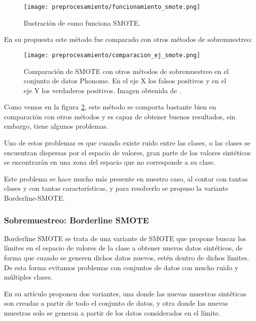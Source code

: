 \begin{figure}[H]
	\centering
	\texttt{[image: preprocesamiento/funcionamiento\_smote.png]}
	\caption{Ilustración de como funciona SMOTE.}
	\label{fig:funcionamiento_smote}
\end{figure}

\newpage

En su propuesta este método fue comparado con otros métodos de sobremuestreo:

\begin{figure}[H]
	\centering
	\texttt{[image: preprocesamiento/comparacion\_ej\_smote.png]}
	\caption{Comparación de SMOTE con otros métodos de sobremuestreo en el conjunto de datos Phonome. En el eje X los falsos positivos y en el eje Y los verdaderos positivos. Imagen obtenida de \cite{SMOTE}.}
	\label{fig:comparacionSMOTE}
\end{figure}

Como vemos en la figura \ref{fig:comparacionSMOTE}, este método se comporta bastante bien en comparación con otros métodos y es capaz de obtener buenos resultados, sin embargo, tiene algunos problemas.

Uno de estos problemas es que cuando existe ruido entre las clases, o las clases se encuentran dispersas por el espacio de valores, gran parte de los valores sintéticos se encontrarán en una zona del espacio que no corresponde a su clase.

Este problema se hace mucho más presente en nuestro caso, al contar con tantas clases y con tantas características, y para resolverlo se propuso la variante Borderline-SMOTE.

\subsubsection{Sobremuestreo: Borderline SMOTE}

Borderline SMOTE \cite{BL-SMOTE} se trata de una variante de SMOTE que propone buscar los límites en el espacio de valores de la clase a obtener nuevos datos sintéticos, de forma que cuando se generen dichos datos nuevos, estén dentro de dichos límites. De esta forma evitamos problemas con conjuntos de datos con mucho ruido y múltiples clases.

En su artículo proponen dos variantes, una donde las nuevas muestras sintéticas son creadas a partir de todo el conjunto de datos, y otra donde las nuevas muestras solo se generan a partir de los datos considerados en el límite.



